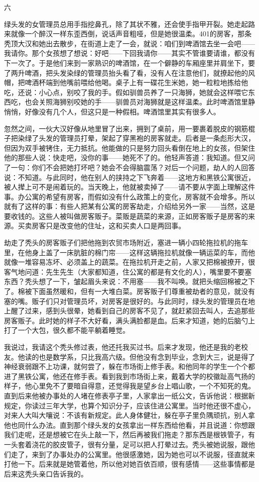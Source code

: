 六 

绿头发的女管理员总用手指挖鼻孔，除了其状不雅，还会使手指甲开裂。她走起路来就像一个醉汉一样东歪西倒，说话声音粗哑，但是她很温柔。401的房客，那条秃顶大汉和她出去散步，在街道上走了一会，就说：咱们到啤酒馆去坐一会吧——我请你。那个女孩想了想说：好吧——下回我请你——其实不管谁要请谁，都没有下一次了。于是他们来到一家熟识的啤酒馆，在一个僻静的车厢座里并肩坐下，要了两升啤酒，把头发染绿的管理员抬头看了看，没有人在注意他们，就撩起他的风帽，把啤酒杯端到他嘴前喂给他喝。桌子上有一碟花生米她，她一粒粒地拣给他吃，还说：小心点，别咬了我的手。假如驯兽员养了一只海狮，她就会这样喂它东西吃，也会关照海狮别咬她的手——驯兽员对海狮就是这样温柔。此时啤酒馆里静悄悄，好像没有几个人，但这只是一种假相。啤酒馆里其实有很多人。 

忽然之间，一伙大汉好像从地里冒了出来，拥到了桌前，用一要裹着脱皮的钢筋棍子把染绿了头发的管理员打晕，架起了穿黑袍的房客就走。后者是一条彪形大汉，但因为双手被铐住，无力抵抗。他能做的只是努力回头看倒在地上的女孩，但架住他的那些人说：快走吧，没你的事——她死不了的。他轻声答道：我知道。但又问了一句：你们不会把她打坏吧？她会不会得脑震荡？对后一个问题，劫人的人回答说：不知道。与此同时，他在别人的挟持之下飞奔着——这地方和黑铁公寓很近，被人撵上可不是闹着玩的。当天晚上，他就被卖掉了——请不要从字面上理解这件事。办公寓的希望有房客，而假如没有什么政策上的变化，房客就不会增多。所以就有了这样的事：有些人把某有公寓的房客劫走，介绍给另外一家——当然，这是要收钱的。这些人被叫做房客贩子。菜贩是蔬菜的来源，正如房客贩子是房客的来源。买卖房客只是改变他的住址，这和买卖人口是两回事。 

劫走了秃头的房客贩子们把他拖到农贸市场附近，塞进一辆小四轮拖拉机的拖车里，在他身上盖了一床肮脏的棉门帘——这样这辆拖拉机就像一辆运菜的车，而他就像一堆容易冻坏、必须盖上的蔬菜。在拖拉机开走之前，人家又把棉被撩开，很客气地问道：先生先生（大家都知道，住公寓的都是有文化的人），嘴里要不要塞东西？秃头想了一下，皱起眉头来说：不用塞——我不叫唤。就把头缩回棉被之下了。棉被下面虽然暖和，但有一大堆白菜。房客贩子们尊重被劫者的意见，就没有塞的嘴。贩子们只对管理员坏，对房客是很好的。与此同时，绿头发的管理员在地上醒了过来，感到头很晕，她看到自己的房客不见了，就赶紧回去叫人，去追那些房客贩子。此时她的样子不大好看，满头满脸都是血。后来才知道，她的后脑勺上打了一个大包，很久都不能平躺着睡觉。 

我说过，我请这个秃头修过表，他还托我买过书。后来才发现，他还是我的老校友。他读的也是数学系，只比我高六级。但他没有念到毕业，念到大三，说是得了神经衰弱跟不上功课，就何尝了，躲在市场街上修手表。和他同年的学生一个个都进了黑铁公寓，他还在修手表。看到我到市场街上来，戴着大学的校徽趾高气扬的样子，他心里免不了要暗自得意，还觉得我是望乡台上唱山歌，一个不知死的鬼。直到后来他被办事处的人堵在修表亭子里，人家拿出一纸公文，告诉他说：根据新规定，你读过三年大学，也算个知识分子，应该住进公寓里。当时他还很不虚心，对来人大叫大嚷说：不该有新规定。此人身体健壮，躲在亭子里负隅顽抗，别人拿他也同什么办法。直到那个绿头发的女孩拿出一样东西给他看，并且说道：你想跟我们走呢，还是想被它在头上敲一下，然后再被我们拖走？那东西是根铁管子，有一头套着浇花的胶皮管子，很有分量，足可以把人打晕过去。秃头被她说服，跟他们走了，来到了办事处办的公寓里。他很感激她，因为她也可以不说服，径直就来打他一下。后来就是她管着他，所以他对她百依百顺，很有感情——这些事情都是后来这秃头亲口告诉我的。 



